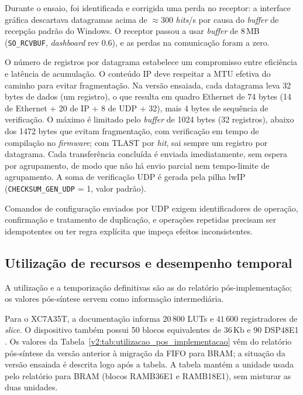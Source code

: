 Durante o ensaio, foi identificada e corrigida uma perda no receptor: a interface gráfica descartava datagramas acima de \(\approx 300\) \textit{hits}/s por causa do \textit{buffer} de recepção padrão do Windows. O receptor passou a usar \textit{buffer} de 8\,MB (\texttt{SO\_RCVBUF}, \textit{dashboard} rev 0.6), e as perdas na comunicação foram a zero.


O número de registros por datagrama estabelece um compromisso entre eficiência e latência de acumulação. O conteúdo IP deve respeitar a MTU efetiva do caminho para evitar fragmentação. Na versão ensaiada, cada datagrama leva 32 bytes de dados (um registro), o que resulta em quadro Ethernet de 74 bytes (14 de Ethernet + 20 de IP + 8 de UDP + 32), mais 4 bytes de sequência de verificação. O máximo é limitado pelo \textit{buffer} de 1024 bytes (32 registros), abaixo dos 1472 bytes que evitam fragmentação, com verificação em tempo de compilação no \textit{firmware}; com TLAST por \textit{hit}, sai sempre um registro por datagrama. Cada transferência concluída é enviada imediatamente, sem espera por agrupamento, de modo que não há envio parcial nem tempo-limite de agrupamento. A soma de verificação UDP é gerada pela pilha lwIP (\texttt{CHECKSUM\_GEN\_UDP} = 1, valor padrão).

Comandos de configuração enviados por UDP exigem identificadores de operação, confirmação e tratamento de duplicação, e operações repetidas precisam ser idempotentes ou ter regra explícita que impeça efeitos inconsistentes.

\subsection{Utilização de recursos e desempenho temporal}
\label{v2:subsec:utilizacao_recursos}

A utilização e a temporização definitivas são as do relatório pós-implementação; os valores pós-síntese servem como informação intermediária.

Para o XC7A35T, a documentação informa \(20\,800\) LUTs e \(41\,600\) registradores de \textit{slice}. O dispositivo também possui 50 blocos equivalentes de \(36\,\mathrm{Kb}\) e 90 DSP48E1 \cite{xilinx2020ds180}. Os valores da Tabela~\ref{v2:tab:utilizacao_pos_implementacao} vêm do relatório pós-síntese da versão anterior à migração da FIFO para BRAM; a situação da versão ensaiada é descrita logo após a tabela. A tabela mantém a unidade usada pelo relatório para BRAM (blocos RAMB36E1 e RAMB18E1), sem misturar as duas unidades.

